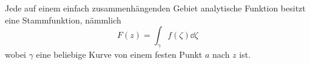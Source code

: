 \begin{folge}[note = Folgerung von Cauchy , index = Folgerung von Cauchy , indexformat = {3!12~}]
	Jede auf einem einfach zusammenhängenden Gebiet analytische Funktion besitzt eine Stammfunktion, nämmlich
	\[ F(z) = \int_\gamma f(\zeta) \dd \zeta \]
	wobei $\gamma$ eine beliebige Kurve von einem festen Punkt $a$ nach $z$ ist.
\end{folge}
